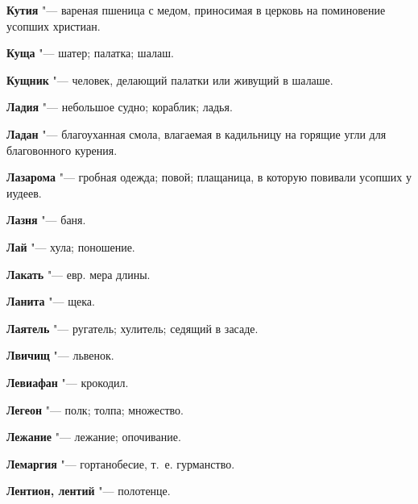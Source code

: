 \begin{mymulticols}{2}
\noindent\textbf{Кутия} "--- вареная пшеница с медом, приносимая в церковь на поминовение усопших христиан. 




\noindent\textbf{Куща} "--- шатер; палатка; шалаш. 




\noindent\textbf{Кущник} "--- человек, делающий палатки или живущий в шалаше. 









\noindent\textbf{Ладия} "--- небольшое судно; кораблик; ладья. 




\noindent\textbf{Ладан} "--- благоуханная смола, влагаемая в кадильницу на горящие угли для благовонного курения. 




\noindent\textbf{Лазарома} "--- гробная одежда; повой; плащаница, в которую повивали усопших у иудеев. 




\noindent\textbf{Лазня} "--- баня. 




\noindent\textbf{Лай} "--- хула; поношение. 




\noindent\textbf{Лакать} "--- евр. мера длины. 




\noindent\textbf{Ланита} "--- щека. 




\noindent\textbf{Лаятель} "--- ругатель; хулитель; седящий в засаде. 




\noindent\textbf{Лвичищ} "--- львенок. 




\noindent\textbf{Левиафан} "--- крокодил. 




\noindent\textbf{Легеон} "--- полк; толпа; множество. 




\noindent\textbf{Лежание} "--- лежание; опочивание. 




\noindent\textbf{Лемаргия} "--- гортанобесие, т.~е. гурманство. 




\noindent\textbf{Лентион, лентий} "--- полотенце. 





\end{mymulticols}

